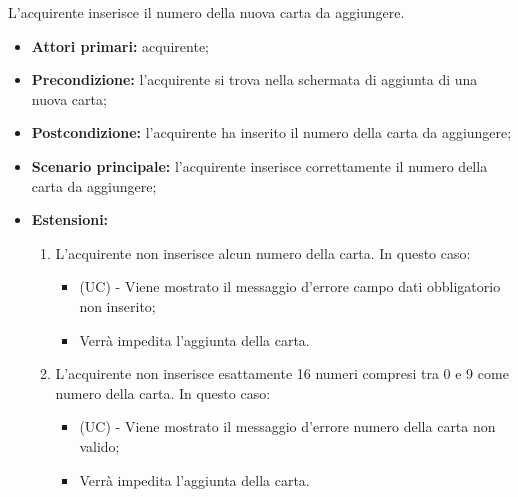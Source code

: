 L'acquirente inserisce il numero della nuova carta da aggiungere.
\begin{itemize}
    \item \textbf{Attori primari:} acquirente;
    \item \textbf{Precondizione:} l'acquirente si trova nella schermata di aggiunta di una nuova carta;
    \item \textbf{Postcondizione:} l'acquirente ha inserito il numero della carta da aggiungere;
    \item \textbf{Scenario principale:} l'acquirente inserisce correttamente il numero della carta da aggiungere;
    \item \textbf{Estensioni:}
    \begin{enumerate}[label=\lett]
        \item L'acquirente non inserisce alcun numero della carta. In questo caso:
        \begin{itemize}
            \item (UC) - Viene mostrato il messaggio d'errore campo dati obbligatorio non inserito;
            \item Verrà impedita l'aggiunta della carta.
        \end{itemize}
        \item L'acquirente non inserisce esattamente 16 numeri compresi tra 0 e 9 come numero della carta. In questo caso:
        \begin{itemize}
            \item (UC) - Viene mostrato il messaggio d'errore numero della carta non valido;
            \item Verrà impedita l'aggiunta della carta.
        \end{itemize}
    \end{enumerate}
\end{itemize}

